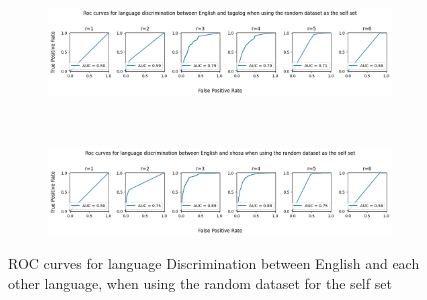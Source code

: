 \documentclass{article}
\begin{document}
\begin{figure}[ht]
\begin{subfigure}[t]{\linewidth}
        \label{fig:eng_mid_pla_rnd}
    \end{subfigure}
    \\
    \begin{subfigure}[t]{\linewidth}
        \centering
        \includegraphics[width=\linewidth]{images/english_tagalog_random.png}
        \label{fig:eng_mid_tag_rnd}
    \end{subfigure}
        \\
    \begin{subfigure}[t]{\linewidth}
        \centering
        \includegraphics[width=\linewidth]{images/english_xhosa_random.png}
        \label{fig:eng_xho_rnd}
    \end{subfigure}
    
    \caption{ROC curves for language Discrimination between English and each other language, when using the random dataset for the self set}
    \label{fig:langs_random}
\end{figure}
\end{document}
